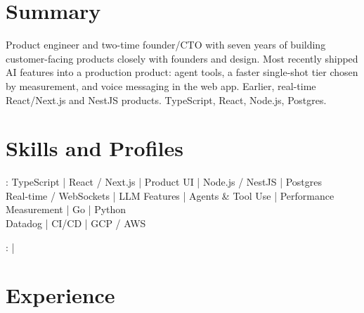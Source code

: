 \documentclass[print]{jack-resume}
\begin{document}
\pagecolor{darkmodeBackground}


\begin{minipage}[t][1cm][t]{.03\textwidth}
    \hfill
\end{minipage}

\section{Summary}
Product engineer and two-time founder/CTO with seven years of building customer-facing products closely with founders and design. Most recently shipped AI features into a production product: agent tools, a faster single-shot tier chosen by measurement, and voice messaging in the web app. Earlier, real-time React/Next.js and NestJS products. TypeScript, React, Node.js, Postgres.
\sectionsep

\section{Skills and Profiles}
:
TypeScript \hfill | \hfill
React / Next.js \hfill | \hfill
Product UI \hfill | \hfill
Node.js / NestJS \hfill | \hfill
Postgres \\
\hspace{1.0cm} Real-time / WebSockets \hfill | \hfill
LLM Features \hfill | \hfill
Agents \& Tool Use \hfill | \hfill
Performance Measurement \hfill | \hfill
Go \hfill | \hfill
Python \\
\hspace{1.0cm} Datadog \hfill | \hfill
CI/CD \hfill | \hfill
GCP / AWS \\

\raggedright{
    :
      \href{https://www.linkedin.com/in/jack-sturtevant/}{ \ExternalLink} |
     \href{https://github.com/jacksturt}{ \ExternalLink}}

\section{Experience}
\end{document}
